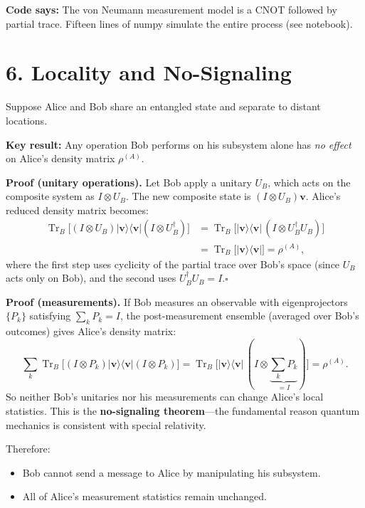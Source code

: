 \documentclass[12pt,a4paper]{article}
\begin{document}
\medskip
\noindent\textbf{Code says:} The von Neumann measurement model is a CNOT followed by partial trace.  Fifteen lines of numpy simulate the entire process (see notebook).

\section{6. Locality and No-Signaling}

Suppose Alice and Bob share an entangled state and separate to distant locations.

\noindent\textbf{Key result:} Any operation Bob performs on his subsystem alone has \emph{no effect} on Alice's density matrix $\rho^{(A)}$.

\medskip
\noindent\textbf{Proof (unitary operations).}  Let Bob apply a unitary $U_B$, which acts on the composite system as $I\otimes U_B$.  The new composite state is $(I\otimes U_B)\mathbf{v}$.  Alice's reduced density matrix becomes:
\begin{align*}
    \operatorname{Tr}_B\bigl[(I\otimes U_B)|\mathbf{v}\rangle\langle\mathbf{v}|(I\otimes U_B^\dagger)\bigr]
    &= \operatorname{Tr}_B\bigl[|\mathbf{v}\rangle\langle\mathbf{v}|\,(I\otimes U_B^\dagger U_B)\bigr] \\
    &= \operatorname{Tr}_B\bigl[|\mathbf{v}\rangle\langle\mathbf{v}|\bigr] = \rho^{(A)},
\end{align*}
where the first step uses cyclicity of the partial trace over Bob's space (since $U_B$ acts only on Bob), and the second uses $U_B^\dagger U_B = I$.\;$\square$

\medskip
\noindent\textbf{Proof (measurements).}  If Bob measures an observable with eigenprojectors $\{P_k\}$ satisfying $\sum_k P_k = I$, the post-measurement ensemble (averaged over Bob's outcomes) gives Alice's density matrix:
\[
    \sum_k \operatorname{Tr}_B\bigl[(I\otimes P_k)|\mathbf{v}\rangle\langle\mathbf{v}|(I\otimes P_k)\bigr]
    = \operatorname{Tr}_B\bigl[|\mathbf{v}\rangle\langle\mathbf{v}|\,(I\otimes \underbrace{\textstyle\sum_k P_k}_{=I})\bigr]
    = \rho^{(A)}.
\]
So neither Bob's unitaries nor his measurements can change Alice's local statistics.  This is the \textbf{no-signaling theorem}---the fundamental reason quantum mechanics is consistent with special relativity.

\medskip
\noindent Therefore:
\begin{itemize}[nosep]
    \item Bob cannot send a message to Alice by manipulating his subsystem.
    \item All of Alice's measurement statistics remain unchanged.
\end{itemize}
\end{document}
